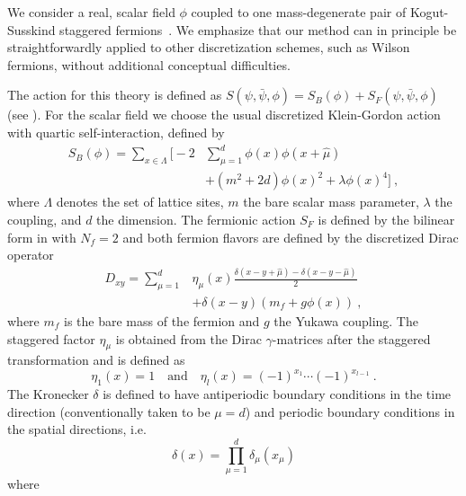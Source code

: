 \documentclass[aps,prd,twocolumn,nofootinbib,superscriptaddress,preprintnumbers]{revtex4-1}
\begin{document}
We consider a real, scalar field $\phi$ coupled to one mass-degenerate pair of Kogut-Susskind staggered fermions~\cite{Kogut:1974ag}. We emphasize that our method can in principle be straightforwardly applied to other discretization schemes, such as Wilson fermions, without additional conceptual difficulties. 

The action for this theory is defined as $S(\psi,\bar{\psi},\phi) = S_B(\phi) + S_F(\psi, \bar{\psi}, \phi)$ (see ). For the scalar field we choose the usual discretized Klein-Gordon action with quartic self-interaction, defined by
%
\begin{equation}
\begin{aligned}
    S_B(\phi) = \sum_{x\in\Lambda}\Bigr[-2 & \sum_{\mu=1}^{d} \phi(x)\phi(x+\hat{\mu}) \\
    &+ (m^2 + 2d)\phi(x)^2 + \lambda\phi(x)^4\Bigr]\ ,
\end{aligned}
\end{equation}
%
where $\Lambda$ denotes the set of lattice sites, $m$ the bare scalar mass parameter, $\lambda$ the coupling, and $d$ the dimension. The fermionic action $S_F$ is defined by the bilinear form in  with $N_f = 2$ and both fermion flavors are defined by the discretized Dirac operator
%
\begin{equation}\label{eq:dirac-op}
\begin{aligned}
    D_{xy} = \sum_{\mu = 1}^{d} & \eta_\mu(x) \frac{\delta(x-y+\hat{\mu})-\delta(x-y-\hat{\mu})}{2}  \\
    &+ \delta(x - y)(m_f + g\phi(x))\ ,
\end{aligned}
\end{equation}
%
where $m_f$ is the bare mass of the fermion and $g$ the Yukawa coupling. The staggered factor $\eta_\mu$ is obtained from the Dirac $\gamma$-matrices after the staggered transformation and is defined as
%
\begin{equation}
    \eta_1(x)=1 \quad \textrm{and} \quad \eta_l(x) = (-1)^{x_1}\cdots(-1)^{x_{l-1}}\ .
\end{equation}
%
The Kronecker $\delta$ is defined to have antiperiodic boundary conditions in the time direction (conventionally taken to be $\mu = d$) and periodic boundary conditions in the spatial directions, i.e.
%
\begin{equation}
    \delta (x) = \prod_{\mu = 1}^d \delta_\mu (x_\mu)
\end{equation}
%
where
%
\end{document}
